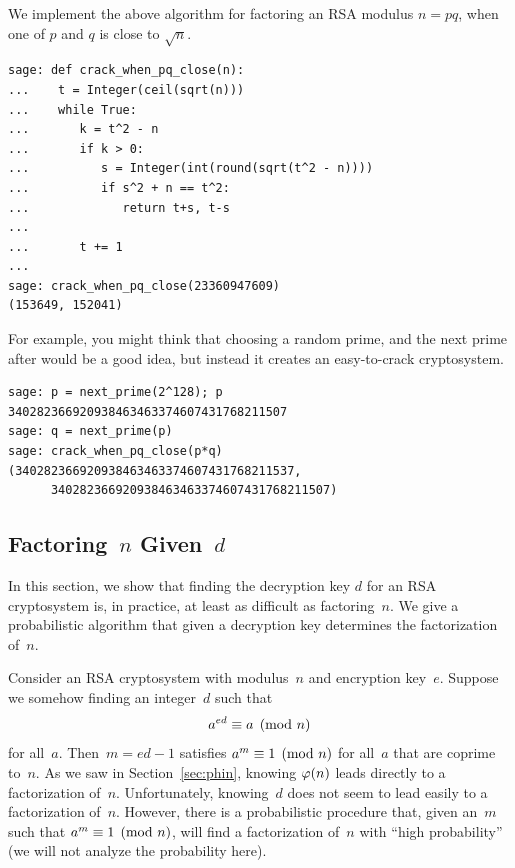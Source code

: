 \begin{sg}
We implement the above algorithm for factoring an RSA modulus
$n=pq$, when one of $p$ and $q$ is close to $\sqrt{n}$.
\begin{verbatim}
sage: def crack_when_pq_close(n):
...    t = Integer(ceil(sqrt(n)))
...    while True:
...       k = t^2 - n
...       if k > 0:
...          s = Integer(int(round(sqrt(t^2 - n))))
...          if s^2 + n == t^2:
...             return t+s, t-s
...
...       t += 1
...
sage: crack_when_pq_close(23360947609)
(153649, 152041)
\end{verbatim}%

For example, you might think that choosing a random
prime, and the next prime after would be a good idea,
but instead it creates an easy-to-crack cryptosystem.
\begin{verbatim}
sage: p = next_prime(2^128); p
340282366920938463463374607431768211507
sage: q = next_prime(p)
sage: crack_when_pq_close(p*q)
(340282366920938463463374607431768211537,
      340282366920938463463374607431768211507)
\end{verbatim}
\end{sg}

\subsection{Factoring~$n$ Given~$d$}
\label{sec:probcrack}
In this section, we show that finding the decryption key $d$ for an
RSA cryptosystem is, in practice, at least as difficult as factoring~$n$.
We give a probabilistic algorithm that given a decryption key
determines the factorization of~$n$.


Consider an RSA cryptosystem with modulus~$n$ and
encryption key~$e$.  Suppose we somehow finding an integer~$d$ such
that
$$
  a^{ed} \equiv a\pmod{n}
$$
for all~$a$.  Then~$m=ed-1$ satisfies $a^m\equiv 1\pmod{n}$ for all~$a$
that are coprime to~$n$.  As we saw in Section~\ref{sec:phin}, knowing
$\varphi(n)$ leads directly to a factorization of~$n$.  Unfortunately,
knowing~$d$ does not seem to lead easily to a factorization of~$n$.
However, there is a probabilistic procedure that, given an~$m$ such
that $a^m\equiv 1\pmod{n}$, will find a factorization of~$n$ with ``high
probability'' (we will not analyze the probability here).

